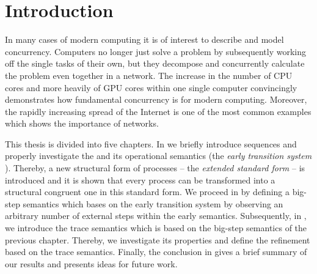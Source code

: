 \chapter{Introduction}
\pagestyle{scrheadings}	
\setcounter{page}{0}
\label{sec_introduction}
In many cases of modern computing it is of interest to describe and model concurrency. Computers no longer just solve a problem by subsequently working off the single tasks of their own, but they decompose and concurrently calculate the problem even together in a network. The increase in the number of CPU cores and more heavily of GPU cores within one single computer convincingly demonstrates how fundamental concurrency is for modern computing. Moreover, the rapidly increasing spread of the Internet is one of the most common examples which shows the importance of networks.

This thesis is divided into five chapters. In  we briefly introduce sequences and properly investigate the \picalc{} and its operational semantics (the \emph{early transition system} \cite{sangiorgi}). Thereby, a new structural form of processes -- the \emph{extended standard form} -- is introduced and it is shown that every process can be transformed into a structural congruent one in this standard form. We proceed in  by defining a big-step semantics which bases on the early transition system by observing an arbitrary number of external steps within the early semantics. Subsequently, in , we introduce the trace semantics which is based on the big-step semantics of the previous chapter. Thereby, we investigate its properties and define the refinement based on the trace semantics. Finally, the conclusion in  gives a brief summary of our results and presents ideas for future work.

